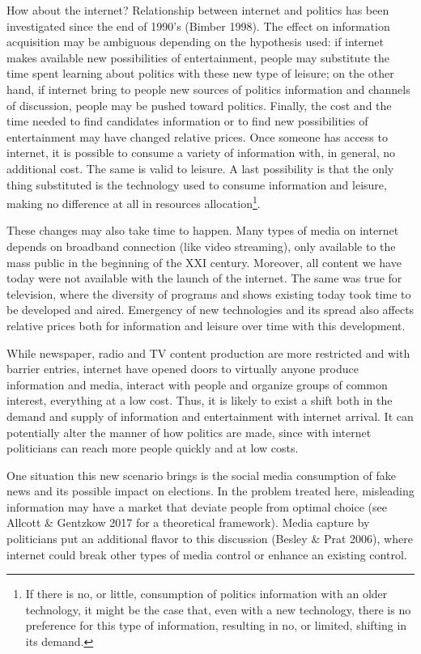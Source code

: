 \documentclass[12pt,]{article}
\let\rmarkdownfootnote\footnote%
\def\footnote{\protect\rmarkdownfootnote}
\begin{document}
How about the internet? Relationship between internet and politics has
been investigated since the end of 1990's (Bimber 1998). The effect on
information acquisition may be ambiguous depending on the hypothesis
used: if internet makes available new possibilities of entertainment,
people may substitute the time spent learning about politics with these
new type of leisure; on the other hand, if internet bring to people new
sources of politics information and channels of discussion, people may
be pushed toward politics. Finally, the cost and the time needed to find
candidates information or to find new possibilities of entertainment may
have changed relative prices. Once someone has access to internet, it is
possible to consume a variety of information with, in general, no
additional cost. The same is valid to leisure. A last possibility is
that the only thing substituted is the technology used to consume
information and leisure, making no difference at all in resources
allocation\footnote{If there is no, or little, consumption of politics
  information with an older technology, it might be the case that, even
  with a new technology, there is no preference for this type of
  information, resulting in no, or limited, shifting in its demand.}.

These changes may also take time to happen. Many types of media on
internet depends on broadband connection (like video streaming), only
available to the mass public in the beginning of the XXI century.
Moreover, all content we have today were not available with the launch
of the internet. The same was true for television, where the diversity
of programs and shows existing today took time to be developed and
aired. Emergency of new technologies and its spread also affects
relative prices both for information and leisure over time with this
development.

While newspaper, radio and TV content production are more restricted and
with barrier entries, internet have opened doors to virtually anyone
produce information and media, interact with people and organize groups
of common interest, everything at a low cost. Thus, it is likely to
exist a shift both in the demand and supply of information and
entertainment with internet arrival. It can potentially alter the manner
of how politics are made, since with internet politicians can reach more
people quickly and at low costs.

One situation this new scenario brings is the social media consumption
of fake news and its possible impact on elections. In the problem
treated here, misleading information may have a market that deviate
people from optimal choice (see Allcott \& Gentzkow 2017 for a
theoretical framework). Media capture by politicians put an additional
flavor to this discussion (Besley \& Prat 2006), where internet could
break other types of media control or enhance an existing control.
\end{document}
